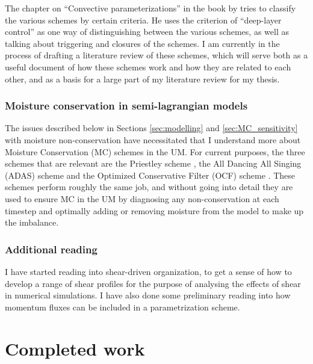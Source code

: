 \documentclass[11pt,a4paper]{article}
\begin{document}
The chapter on ``Convective parameterizations'' in the book by \cite{stensrud2009parameterization} tries to classify the various schemes by certain criteria. He uses the criterion of ``deep-layer control'' as one way of distinguishing between the various schemes, as well as talking about triggering and closures of the schemes. I am currently in the process of drafting a literature review of these schemes, which will serve both as a useful document of how these schemes work and how they are related to each other, and as a basis for a large part of my literature review for my thesis.



\subsubsection{Moisture conservation in semi-lagrangian models}
\label{sec:MC_in_SL}
The issues described below in Sections \ref{sec:modelling} and \ref{sec:MC_sensitivity} with moisture non-conservation have necessitated that I understand more about Moisture Conservation (MC) schemes in the UM. For current purposes, the three schemes that are relevant are the Priestley scheme \parencite{priestley1993quasi}, the All Dancing All Singing (ADAS) scheme \parencite{zerroukat2010simple} and the Optimized Conservative Filter (OCF) scheme \parencite{zerroukat2015monotonic}. %
These schemes perform roughly the same job, and without going into detail they are used to ensure MC in the UM by diagnosing any non-conservation at each timestep and optimally adding or removing moisture from the model to make up the imbalance.

\subsubsection{Additional reading}
I have started reading into shear-driven organization, to get a sense of how to develop a range of shear profiles for the purpose of analysing the effects of shear in numerical simulations. I have also done some preliminary reading into how momentum fluxes can be included in a parametrization scheme.


\section{Completed work}
\end{document}

